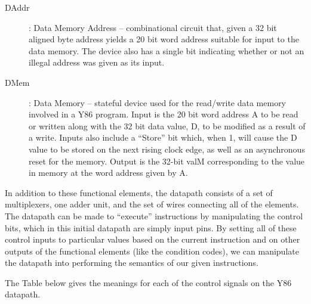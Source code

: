 \documentclass[11pt]{article}
\begin{document}
\begin{description}
\item[DAddr]: Data Memory Address -- combinational circuit that, given a 32 bit aligned byte address yields a 20 bit word address suitable for input to the data memory.  The device also has a single bit indicating whether or not an illegal address was given as its input.
\item[DMem]: Data Memory -- stateful device used for the read/write data memory involved in a Y86 program.  Input is the 20 bit word address A to be read or written along with the 32 bit data value, D, to be modified as a result of a write.  Inputs also include a ``Store'' bit which, when 1, will cause the D value to be stored on the next rising clock edge, as well as an asynchronous reset for the memory.  Output is the 32-bit valM corresponding to the value in memory at the word address given by A.
\end{description}
In addition to these functional elements, the datapath consists of a set of multiplexers, one adder unit, and the set of wires connecting all of the elements.  The datapath can be made to ``execute'' instructions by manipulating the control bits, which in this initial datapath are simply input pins.  By setting all of these control inputs to particular values based on the current instruction and on other outputs of the functional elements (like the condition codes), we can manipulate the datapath into performing the semantics of our given instructions.

The Table below gives the meanings for each of the control signals on the Y86 datapath.
\end{document}
